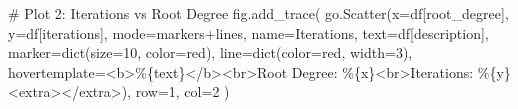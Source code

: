 \documentclass[
  letterpaper,
  DIV=11,
  numbers=noendperiod]{scrartcl}
\newenvironment{Shaded}{\begin{snugshade}}{\end{snugshade}}
\newcommand{\BuiltInTok}[1]{\textcolor[rgb]{0.00,0.23,0.31}{#1}}
\newcommand{\CommentTok}[1]{\textcolor[rgb]{0.37,0.37,0.37}{#1}}
\newcommand{\DecValTok}[1]{\textcolor[rgb]{0.68,0.00,0.00}{#1}}
\newcommand{\NormalTok}[1]{\textcolor[rgb]{0.00,0.23,0.31}{#1}}
\newcommand{\OperatorTok}[1]{\textcolor[rgb]{0.37,0.37,0.37}{#1}}
\newcommand{\SpecialCharTok}[1]{\textcolor[rgb]{0.37,0.37,0.37}{#1}}
\newcommand{\StringTok}[1]{\textcolor[rgb]{0.13,0.47,0.30}{#1}}
\begin{document}
\begin{Shaded}
\begin{Highlighting}[]
\CommentTok{\# Plot 2: Iterations vs Root Degree  }
\NormalTok{fig.add\_trace(}
\NormalTok{    go.Scatter(x}\OperatorTok{=}\NormalTok{df[}\StringTok{\textquotesingle{}root\_degree\textquotesingle{}}\NormalTok{], y}\OperatorTok{=}\NormalTok{df[}\StringTok{\textquotesingle{}iterations\textquotesingle{}}\NormalTok{],}
\NormalTok{               mode}\OperatorTok{=}\StringTok{\textquotesingle{}markers+lines\textquotesingle{}}\NormalTok{,}
\NormalTok{               name}\OperatorTok{=}\StringTok{\textquotesingle{}Iterations\textquotesingle{}}\NormalTok{,}
\NormalTok{               text}\OperatorTok{=}\NormalTok{df[}\StringTok{\textquotesingle{}description\textquotesingle{}}\NormalTok{],}
\NormalTok{               marker}\OperatorTok{=}\BuiltInTok{dict}\NormalTok{(size}\OperatorTok{=}\DecValTok{10}\NormalTok{, color}\OperatorTok{=}\StringTok{\textquotesingle{}red\textquotesingle{}}\NormalTok{),}
\NormalTok{               line}\OperatorTok{=}\BuiltInTok{dict}\NormalTok{(color}\OperatorTok{=}\StringTok{\textquotesingle{}red\textquotesingle{}}\NormalTok{, width}\OperatorTok{=}\DecValTok{3}\NormalTok{),}
\NormalTok{               hovertemplate}\OperatorTok{=}\StringTok{\textquotesingle{}\textless{}b\textgreater{}\%}\SpecialCharTok{\{text\}}\StringTok{\textless{}/b\textgreater{}\textless{}br\textgreater{}Root Degree: \%}\SpecialCharTok{\{x\}}\StringTok{\textless{}br\textgreater{}Iterations: \%}\SpecialCharTok{\{y\}}\StringTok{\textless{}extra\textgreater{}\textless{}/extra\textgreater{}\textquotesingle{}}\NormalTok{),}
\NormalTok{    row}\OperatorTok{=}\DecValTok{1}\NormalTok{, col}\OperatorTok{=}\DecValTok{2}
\NormalTok{)}


\end{Highlighting}
\end{Shaded}
\end{document}
